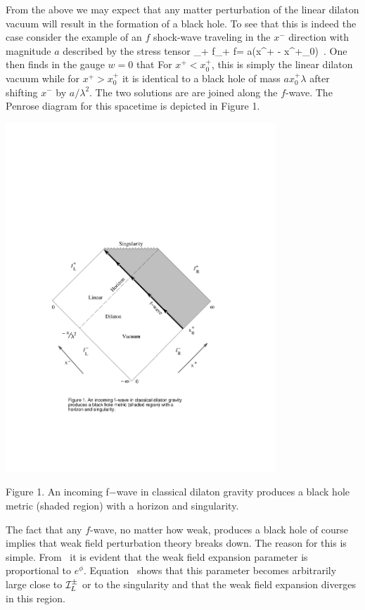 {}From the  above we may expect that any matter perturbation of the linear
dilaton vacuum will result in the formation of a black hole. To see that
this is indeed the case consider the example of
an $f$ shock-wave traveling in the $x^-$ direction with magnitude $a$
described by the stress tensor
\eqn\twelve
{\half \partial_+ f\partial_+ f= a\delta (x^+ - x^+_0)\ .}
One then finds in the gauge $w=0$ that
\eqn{}
For $x^+<x^+_0$, this is  simply the linear dilaton vacuum while for
$x^+ > x^+_0$ it is identical to a black hole of mass $ax^+_0 \lambda$ after
shifting $x^-$ by $a/\lambda^2$.
The two solutions are
are joined along the $f$-wave.  The Penrose diagram for this
spacetime is depicted in Figure 1.
\goodbreak
\topinsert
\centerline{\includegraphics[width=4in]{fig1.pdf}}
\noindent
Figure 1. An incoming f−wave in classical dilaton gravity produces a black hole metric (shaded region) with a horizon and singularity.\endinsert

The fact that any $f$-wave, no matter how weak, produces
a black hole of course implies that weak field perturbation theory
breaks down. The reason for this is simple. From \one\ it is
evident that the weak field expansion parameter is proportional to
$e^{\phi}$. Equation \thirteen\ shows that this parameter becomes arbitrarily
large close to ${\cal I}_L^\pm$ or to the singularity and that
the weak field expansion diverges in this region.

